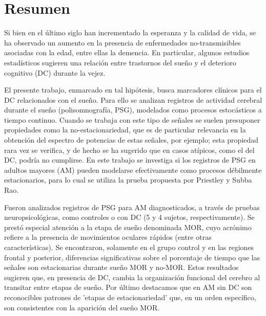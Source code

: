 \documentclass[12pt,a4paper]{mitthesis}
\begin{document}
\setcounter{page}{1}

\chapter*{Resumen}

{\small

Si bien en el \'ultimo siglo han incrementado la esperanza y la calidad de vida, se ha observado 
\cite{PlanAlzheimer04} un aumento en la presencia de enfermedades no-transmisibles asociadas con 
la edad, entre ellas la demencia.
En particular, algunos estudios estad\'isticos \cite{Amer13,Miyata13,Potvin12} sugieren una 
relaci\'on entre trastornos del sue\~no y el deterioro cognitivo (DC) durante la vejez.

El presente trabajo, enmarcado en tal hip\'otesis, busca marcadores cl\'inicos para el DC
relacionados con el sue\~no.
Para ello se analizan registros de actividad cerebral durante el sue\~no (polisomnograf\'ia, PSG), 
modelados como procesos estoc\'asticos a tiempo continuo. 
Cuando se trabaja con este tipo de se\~nales se suelen presuponer propiedades como la 
no-estacionariedad, que es de particular relevancia en la obtenci\'on del espectro de potencias de 
estas se\~nales, por ejemplo; esta propiedad rara vez se verifica, y de hecho se ha sugerido
\cite{McEwen75,Cohen77,Sugimoto78} que en casos at\'ipicos, como el del DC, podr\'ia no cumplirse. 
En este trabajo se investiga si los registros de PSG en adultos mayores (AM) pueden modelarse 
efectivamente como procesos d\'ebilmente estacionarios, para lo cual se utiliza la prueba propuesta 
por Priestley y Subba Rao.

Fueron analizados registros de PSG para AM diagnosticados, a trav\'es de pruebas 
neuropsicol\'ogicas, como controles o con DC (5 y 4 sujetos, respectivamente). 
Se prest\'o especial atenci\'on a la etapa de sue\~no denominada MOR, cuyo acr\'onimo refiere a la
presencia de movimientos oculares r\'apidos (entre otras caracter\'isticas).
Se encontraron, solamente en el grupo control y en las regiones frontal y posterior, diferencias 
significativas sobre el porcentaje de tiempo que las se\~nales son estacionarias durante sue\~no 
MOR y no-MOR.
Estos resultados sugieren que, en presencia de DC, cambia la organizaci\'on funcional del cerebro 
al transitar entre etapas de sue\~no.
Por \'ultimo destacamos que en AM sin DC son reconocibles patrones de 'etapas de estacionariedad' 
que, en un orden espec\'ifico, son consistentes con la aparici\'on del sue\~no MOR.

}
\end{document}
